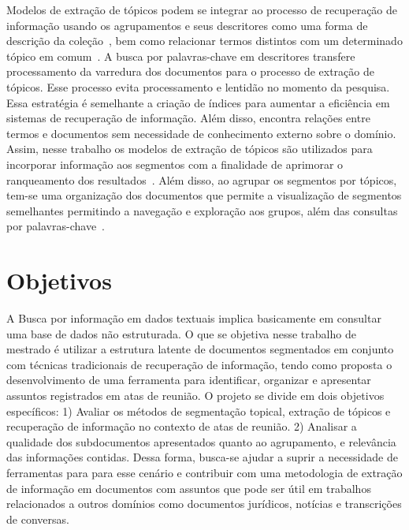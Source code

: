 Modelos de extração de tópicos podem se integrar ao processo de recuperação de informação usando os agrupamentos e seus descritores como uma forma de descrição da coleção~\cite{Zhai2017, Xing2009}, bem como relacionar termos distintos com um determinado tópico em comum~\cite{WEIXING}.  
A busca por palavras-chave em descritores transfere processamento da varredura dos documentos para o processo de extração de tópicos. Esse processo evita processamento e lentidão no momento da pesquisa. Essa estratégia é semelhante a criação de índices para aumentar a eficiência em sistemas de recuperação de informação. Além disso, encontra relações entre termos e documentos sem necessidade de conhecimento externo sobre o domínio.
%
Assim, nesse trabalho os modelos de extração de tópicos são utilizados para incorporar informação aos segmentos com a finalidade de aprimorar o ranqueamento dos resultados~\cite{WEIXING}. 
% 
Além disso, ao agrupar os segmentos por tópicos, tem-se uma organização dos documentos que permite a visualização de segmentos semelhantes permitindo a navegação e exploração aos grupos, além das consultas por palavras-chave~\cite{Maracini2010}.
%











\section{Objetivos}

A Busca por informação em dados textuais implica basicamente em consultar uma base de dados não estruturada. O que se objetiva nesse trabalho de mestrado é utilizar a estrutura latente de documentos segmentados em conjunto com técnicas tradicionais de recuperação de informação, tendo como 
proposta o desenvolvimento de uma ferramenta para identificar, organizar e apresentar assuntos registrados em atas de reunião. O projeto se divide em dois objetivos específicos: 1) Avaliar os métodos de segmentação topical, extração de tópicos e recuperação de informação no contexto de atas de reunião. 2) Analisar a qualidade dos subdocumentos apresentados quanto ao agrupamento, e relevância das informações contidas.
Dessa forma, busca-se ajudar a suprir a necessidade de ferramentas para para esse cenário e contribuir com uma metodologia de extração de informação em documentos com assuntos que pode ser útil em trabalhos relacionados a outros domínios como documentos jurídicos, notícias e transcrições de conversas.


